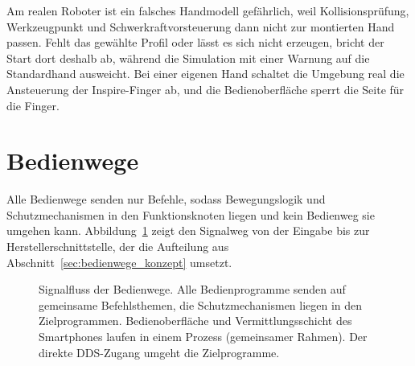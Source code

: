 Am realen Roboter ist ein falsches Handmodell gefährlich, weil Kollisionsprüfung, Werkzeugpunkt und Schwerkraftvorsteuerung dann nicht zur montierten Hand passen.
Fehlt das gewählte Profil oder lässt es sich nicht erzeugen, bricht der Start dort deshalb ab, während die Simulation mit einer Warnung auf die Standardhand ausweicht.
Bei einer eigenen Hand schaltet die Umgebung real die Ansteuerung der Inspire-Finger ab, und die Bedienoberfläche sperrt die Seite für die Finger.

\section{Bedienwege}
\label{sec:bedienwege}
Alle Bedienwege senden nur Befehle, sodass Bewegungslogik und Schutzmechanismen in den Funktionsknoten liegen und kein Bedienweg sie umgehen kann.
Abbildung~\ref{fig:bedienwege_signal} zeigt den Signalweg von der Eingabe bis zur Herstellerschnittstelle, der die Aufteilung aus Abschnitt~\ref{sec:bedienwege_konzept} umsetzt.

\begin{figure}[htbp]
  \centering
  
  \caption[Signalfluss der Bedienwege]{Signalfluss der Bedienwege. Alle Bedienprogramme senden auf gemeinsame Befehlsthemen, die Schutzmechanismen liegen in den Zielprogrammen. Bedienoberfläche und Vermittlungsschicht des Smartphones laufen in einem Prozess (gemeinsamer Rahmen). Der direkte DDS-Zugang umgeht die Zielprogramme.}
  \label{fig:bedienwege_signal}
\end{figure}

